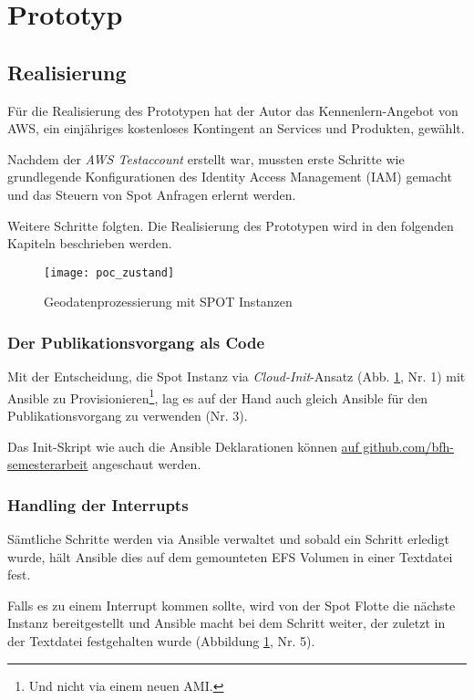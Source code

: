 \section{Prototyp}
\subsection{Realisierung}
Für die Realisierung des Prototypen hat der Autor das Kennenlern-Angebot von AWS, ein einjähriges kostenloses Kontingent an Services und Produkten\cite{FreeTier2020}, gewählt. 

Nachdem der \emph{AWS Testaccount} erstellt war, mussten erste Schritte wie grundlegende Konfigurationen des Identity Access Management (IAM) gemacht und das Steuern von Spot Anfragen erlernt werden.

Weitere Schritte folgten. Die Realisierung des Prototypen wird in den folgenden Kapiteln beschrieben werden.

\begin{figure}[H]
	\centering
	\texttt{[image: poc\_zustand]}
	\caption{Geodatenprozessierung mit SPOT Instanzen}
	\label{fig:ist_zustand}
\end{figure}

\subsubsection{Der Publikationsvorgang als Code}
Mit der Entscheidung, die Spot Instanz via \emph{Cloud-Init}-Ansatz (Abb. \ref{fig:ist_zustand}, Nr. 1) mit Ansible zu Provisionieren\footnote{Und nicht via einem neuen AMI.}, lag es auf der Hand auch gleich Ansible für den Publikationsvorgang zu verwenden (Nr. 3).

Das Init-Skript wie auch die Ansible Deklarationen können \href{https://github.com/bfh-semesterarbeit/up-and-running-dataprocessing}{auf github.com/bfh-semesterarbeit} angeschaut werden.




\subsubsection{Handling der Interrupts}
Sämtliche Schritte werden via Ansible verwaltet und sobald ein Schritt erledigt wurde, hält Ansible dies auf dem gemounteten EFS Volumen in einer Textdatei fest.

Falls es zu einem Interrupt kommen sollte, wird von der Spot Flotte die nächste Instanz bereitgestellt und Ansible macht bei dem Schritt weiter, der zuletzt in der Textdatei festgehalten wurde (Abbildung \ref{fig:ist_zustand}, Nr. 5).



